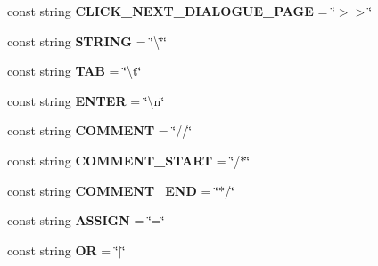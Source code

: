 \begin{DoxyCompactItemize}
\item 
const string {\bfseries C\+L\+I\+C\+K\+\_\+\+N\+E\+X\+T\+\_\+\+D\+I\+A\+L\+O\+G\+U\+E\+\_\+\+P\+A\+GE} = \char`\"{}$>$$>$\char`\"{}\hypertarget{classdoki_script_setting_1_1_script_keyword_a531a92ce586fa5c5076da7021d05c3b7}{}\label{classdoki_script_setting_1_1_script_keyword_a531a92ce586fa5c5076da7021d05c3b7}

\item 
const string {\bfseries S\+T\+R\+I\+NG} = \char`\"{}\textbackslash{}\char`\"{}\char`\"{}\hypertarget{classdoki_script_setting_1_1_script_keyword_a231de469c928469961ab28120eed5182}{}\label{classdoki_script_setting_1_1_script_keyword_a231de469c928469961ab28120eed5182}

\item 
const string {\bfseries T\+AB} = \char`\"{}\textbackslash{}t\char`\"{}\hypertarget{classdoki_script_setting_1_1_script_keyword_a3100b9214df58e274aba0b04b8429aba}{}\label{classdoki_script_setting_1_1_script_keyword_a3100b9214df58e274aba0b04b8429aba}

\item 
const string {\bfseries E\+N\+T\+ER} = \char`\"{}\textbackslash{}n\char`\"{}\hypertarget{classdoki_script_setting_1_1_script_keyword_acf29e843788dbcf2e32c777c740192d4}{}\label{classdoki_script_setting_1_1_script_keyword_acf29e843788dbcf2e32c777c740192d4}

\item 
const string {\bfseries C\+O\+M\+M\+E\+NT} = \char`\"{}//\char`\"{}\hypertarget{classdoki_script_setting_1_1_script_keyword_a802a0dec6b9c0a30199f49a3e5aa72e6}{}\label{classdoki_script_setting_1_1_script_keyword_a802a0dec6b9c0a30199f49a3e5aa72e6}

\item 
const string {\bfseries C\+O\+M\+M\+E\+N\+T\+\_\+\+S\+T\+A\+RT} = \char`\"{}/$\ast$\char`\"{}\hypertarget{classdoki_script_setting_1_1_script_keyword_ad535b41caa80404a1b50228707f82d82}{}\label{classdoki_script_setting_1_1_script_keyword_ad535b41caa80404a1b50228707f82d82}

\item 
const string {\bfseries C\+O\+M\+M\+E\+N\+T\+\_\+\+E\+ND} = \char`\"{}$\ast$/\char`\"{}\hypertarget{classdoki_script_setting_1_1_script_keyword_a7c817fd69b607a33b86e13a695941a3f}{}\label{classdoki_script_setting_1_1_script_keyword_a7c817fd69b607a33b86e13a695941a3f}

\item 
const string {\bfseries A\+S\+S\+I\+GN} = \char`\"{}=\char`\"{}\hypertarget{classdoki_script_setting_1_1_script_keyword_a14593305d54e6d73765c3002fa37def3}{}\label{classdoki_script_setting_1_1_script_keyword_a14593305d54e6d73765c3002fa37def3}

\item 
const string {\bfseries OR} = \char`\"{}$\vert$\char`\"{}\hypertarget{classdoki_script_setting_1_1_script_keyword_ac992cc4cc624a056ee5aa6bd0848827d}{}\label{classdoki_script_setting_1_1_script_keyword_ac992cc4cc624a056ee5aa6bd0848827d}

\end{DoxyCompactItemize}


